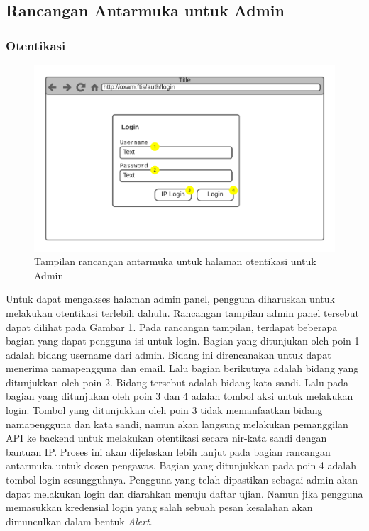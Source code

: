 \subsection{Rancangan Antarmuka untuk Admin}
    
\subsubsection{Otentikasi}
    \begin{figure}
        \centering
        \includegraphics[width=0.7\paperwidth]{Gambar/mockups/Mockup--Admin - Login.pdf}
        \caption{Tampilan rancangan antarmuka untuk halaman otentikasi untuk Admin}
        \label{fig:mockup_admin_login}
    \end{figure}
    Untuk dapat mengakses halaman admin panel, pengguna diharuskan untuk
    melakukan otentikasi terlebih dahulu. Rancangan tampilan admin panel
    tersebut dapat dilihat pada Gambar \ref{fig:mockup_admin_login}. Pada
    rancangan tampilan, terdapat beberapa bagian yang dapat pengguna isi untuk
    login. Bagian yang ditunjukan oleh poin 1 adalah bidang username dari admin.
    Bidang ini direncanakan untuk dapat menerima namapengguna dan email. Lalu
    bagian berikutnya adalah bidang yang ditunjukkan oleh poin 2. Bidang
    tersebut adalah bidang kata sandi. Lalu pada bagian yang ditunjukan oleh
    poin 3 dan 4 adalah tombol aksi untuk melakukan login. Tombol yang
    ditunjukkan oleh poin 3 tidak memanfaatkan bidang namapengguna dan kata
    sandi, namun akan langsung melakukan pemanggilan API ke backend untuk
    melakukan otentikasi secara nir-kata sandi dengan bantuan IP. Proses ini
    akan dijelaskan lebih lanjut pada bagian rancangan antarmuka untuk dosen
    pengawas. Bagian yang ditunjukkan pada poin 4 adalah tombol login
    sesungguhnya. Pengguna yang telah dipastikan sebagai admin akan dapat
    melakukan login dan diarahkan menuju daftar ujian. Namun jika pengguna
    memasukkan kredensial login yang salah sebuah pesan kesalahan akan
    dimunculkan dalam bentuk \textit{Alert}.
    
